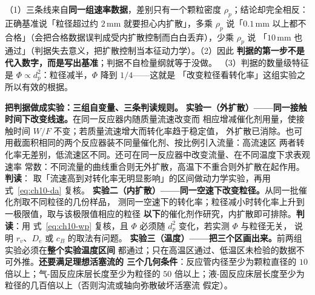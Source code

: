 \begin{infer}
（1）三条线来自\textbf{同一组速率数据}，差别只有一个颗粒密度 $\rho_p$；结论却完全相反：
正确基准说「粒径超过约 $2$\,\unit{mm} 就要担心内扩散」，多乘 $\rho_p$ 说「$0.1$\,\unit{mm}
以上都不合格」（会把合格数据误判成受内扩散控制而白白丢弃），少乘 $\rho_p$ 说
「$10$\,\unit{mm} 也通过」（判据失去意义，把扩散控制当本征动力学）。（2）因此
\textbf{判据的第一步不是代入数字，而是写出基准}；判据不自检量纲就等于没做。
（3）判据的数量级特征是 $\Phi\propto d_p^2$：粒径减半，$\Phi$ 降到 $1/4$——这就是
「改变粒径看转化率」这组实验之所以有效的根据。
\end{infer}

\begin{measure}
\textbf{把判据做成实验：三组自变量、三条判读规则。}
\textbf{实验一（外扩散）——同一接触时间下改变线速。}在同一反应器内随质量流速改变而
相应增减催化剂用量，使接触时间 $W/F$ 不变；若质量流速增大而转化率趋于稳定值，
外扩散已消除。也可用截面积相同的两个反应器装不同量催化剂、按比例引入流量：高流速区
两者转化率无差别，低流速区不同。还可在同一反应器中改变流量、在不同温度下求表观速率
常数：不同流量的曲线重合则无外扩散，高温下不重合则外扩散在起作用。\textbf{判读}：
取「流速高到对转化率无明显影响」的区间做动力学实验，再用
式~\eqref{eq:ch10-da} 复核。
\textbf{实验二（内扩散）——同一空速下改变粒径。}从同一批催化剂取不同粒径的几份样品，
测同一空速下的转化率；粒径减小时转化率上升到一极限值，取与该极限值相应的粒径
\textbf{以下}的催化剂作研究，内扩散即可排除。\textbf{判读}：用
式~\eqref{eq:ch10-wp} 复核，且 $\Phi$ 必须随 $d_p^2$ 变化，若实测 $\Phi$ 与粒径无关，
说明 $r_v$、$D_e$ 或 $c_B$ 的取法有问题。
\textbf{实验三（温度）——把三个区画出来。}前两组实验必须在\textbf{整个实验温度区间}
都通过；只在高温区通过、低温区未检验的数据不可外推。\textbf{还要满足理想活塞流的
三个几何条件}：反应管内径至少为颗粒直径的 $10$ 倍以上；气-固反应床层长度至少为粒径的
$50$ 倍以上；液-固反应床层长度至少为粒径的几百倍以上（否则沟流或轴向弥散破坏活塞流
假定）。
\end{measure}

